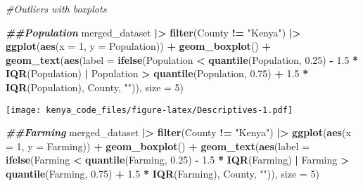 \documentclass[
]{article}
\newenvironment{Shaded}{\begin{snugshade}}{\end{snugshade}}
\newcommand{\AttributeTok}[1]{\textcolor[rgb]{0.13,0.29,0.53}{#1}}
\newcommand{\CommentTok}[1]{\textcolor[rgb]{0.56,0.35,0.01}{\textit{#1}}}
\newcommand{\DecValTok}[1]{\textcolor[rgb]{0.00,0.00,0.81}{#1}}
\newcommand{\DocumentationTok}[1]{\textcolor[rgb]{0.56,0.35,0.01}{\textbf{\textit{#1}}}}
\newcommand{\FloatTok}[1]{\textcolor[rgb]{0.00,0.00,0.81}{#1}}
\newcommand{\FunctionTok}[1]{\textcolor[rgb]{0.13,0.29,0.53}{\textbf{#1}}}
\newcommand{\NormalTok}[1]{#1}
\newcommand{\SpecialCharTok}[1]{\textcolor[rgb]{0.81,0.36,0.00}{\textbf{#1}}}
\newcommand{\StringTok}[1]{\textcolor[rgb]{0.31,0.60,0.02}{#1}}
\begin{document}
\begin{Shaded}
\begin{Highlighting}[]
\CommentTok{\#Outliers with boxplots}

\DocumentationTok{\#\#Population}
\NormalTok{merged\_dataset }\SpecialCharTok{|\textgreater{}} 
  \FunctionTok{filter}\NormalTok{(County }\SpecialCharTok{!=} \StringTok{"Kenya"}\NormalTok{) }\SpecialCharTok{|\textgreater{}} 
  \FunctionTok{ggplot}\NormalTok{(}\FunctionTok{aes}\NormalTok{(}\AttributeTok{x =} \DecValTok{1}\NormalTok{, }\AttributeTok{y =}\NormalTok{ Population)) }\SpecialCharTok{+}
  \FunctionTok{geom\_boxplot}\NormalTok{() }\SpecialCharTok{+}
  \FunctionTok{geom\_text}\NormalTok{(}\FunctionTok{aes}\NormalTok{(}\AttributeTok{label =} \FunctionTok{ifelse}\NormalTok{(Population }\SpecialCharTok{\textless{}} \FunctionTok{quantile}\NormalTok{(Population, }\FloatTok{0.25}\NormalTok{) }\SpecialCharTok{{-}} \FloatTok{1.5} \SpecialCharTok{*} \FunctionTok{IQR}\NormalTok{(Population) }\SpecialCharTok{|} 
\NormalTok{                                  Population }\SpecialCharTok{\textgreater{}} \FunctionTok{quantile}\NormalTok{(Population, }\FloatTok{0.75}\NormalTok{) }\SpecialCharTok{+} \FloatTok{1.5} \SpecialCharTok{*} \FunctionTok{IQR}\NormalTok{(Population), County, }\StringTok{""}\NormalTok{)),}
            \AttributeTok{size =} \DecValTok{5}\NormalTok{)}
\end{Highlighting}
\end{Shaded}

\texttt{[image: kenya\_code\_files/figure-latex/Descriptives-1.pdf]}

\begin{Shaded}
\begin{Highlighting}[]
\DocumentationTok{\#\#Farming}
\NormalTok{merged\_dataset }\SpecialCharTok{|\textgreater{}} 
  \FunctionTok{filter}\NormalTok{(County }\SpecialCharTok{!=} \StringTok{"Kenya"}\NormalTok{) }\SpecialCharTok{|\textgreater{}} 
  \FunctionTok{ggplot}\NormalTok{(}\FunctionTok{aes}\NormalTok{(}\AttributeTok{x =} \DecValTok{1}\NormalTok{, }\AttributeTok{y =}\NormalTok{ Farming)) }\SpecialCharTok{+}
  \FunctionTok{geom\_boxplot}\NormalTok{() }\SpecialCharTok{+}
  \FunctionTok{geom\_text}\NormalTok{(}\FunctionTok{aes}\NormalTok{(}\AttributeTok{label =} \FunctionTok{ifelse}\NormalTok{(Farming }\SpecialCharTok{\textless{}} \FunctionTok{quantile}\NormalTok{(Farming, }\FloatTok{0.25}\NormalTok{) }\SpecialCharTok{{-}} \FloatTok{1.5} \SpecialCharTok{*} \FunctionTok{IQR}\NormalTok{(Farming) }\SpecialCharTok{|} 
\NormalTok{                                  Farming }\SpecialCharTok{\textgreater{}} \FunctionTok{quantile}\NormalTok{(Farming, }\FloatTok{0.75}\NormalTok{) }\SpecialCharTok{+} \FloatTok{1.5} \SpecialCharTok{*} \FunctionTok{IQR}\NormalTok{(Farming), County, }\StringTok{""}\NormalTok{)),}
            \AttributeTok{size =} \DecValTok{5}\NormalTok{)}
\end{Highlighting}
\end{Shaded}
\end{document}
